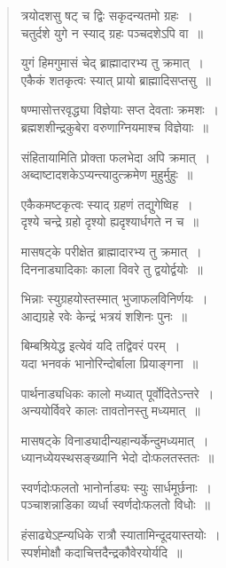 \documentclass[11pt, openany]{book}
\begin{document}
\begin{quote}
{\qt त्रयोदशसु षट् च द्विः सकृदन्यतमो ग्रहः~।\\
चतुर्दशे युगे न स्याद् ग्रहः पञ्चदशेऽपि वा~॥

युगं हिमगुमासं चेद् ब्राह्मादारभ्य तु क्रमात्~।\\
एकैकं शतकृत्वः स्यात् प्रायो ब्राह्मादिसप्तसु~॥

षण्मासोत्तरवृद्ध्या विज्ञेयाः सप्त देवताः क्रमशः~।\\
ब्रह्मशशीन्द्रकुबेरा वरुणाग्नियमाश्च विज्ञेयाः~॥

संहितायामिति प्रोक्ता फलभेदा अपि क्रमात्~।\\
अब्दाष्टादशकेऽप्यन्त्यादुत्क्रमेण मुहुर्मुहुः~॥

एकैकमष्टकृत्वः स्याद् ग्रहणं तद्युगेष्विह~।\\
दृश्ये चन्द्रे ग्रहो दृश्यो ह्यदृश्यार्धगते न च~॥

मासषट्के परीक्षेत ब्राह्मादारभ्य तु क्रमात्~।\\
दिननाड्यादिकाः काला विवरे तु द्वयोर्द्वयोः~॥

भिन्नाः स्युग्रहयोस्तस्मात् भुजाफलविनिर्णयः~।\\
आद्यग्रहे रवेः केन्द्रं भत्रयं शशिनः पुनः~॥

बिम्बश्रियेद्ध इत्येवं यदि तद्विवरं परम्~।\\
यदा भनवकं भानोरिन्दोर्बाला प्रियाङ्गना~॥

पार्थनाड्यधिकः कालो मध्यात् पूर्वोदितेऽन्तरे~।\\
अन्ययोर्विवरे कालः तावतोनस्तु मध्यमात्~॥

मासषट्के विनाड्यादीन्यहान्यर्केन्दुमध्यमात्~।\\
ध्यानध्येयस्थसङ्ख्यानि भेदो दोःफलतस्ततः~॥

स्वर्णदोःफलतो भानोर्नाड्यः स्युः सार्धमूर्छनाः~।\\
पञ्चाशन्नाडिका व्यर्धा स्वर्णदोःफलतो विधोः~॥

हंसाढ्येऽह्न्यधिके रात्रौ स्यातामिन्दूदयास्तयोः~।\\
स्पर्शमोक्षौ कदाचित्तदैन्द्रकौवेरयोर्यदि~॥}
\end{quote}
\end{document}
